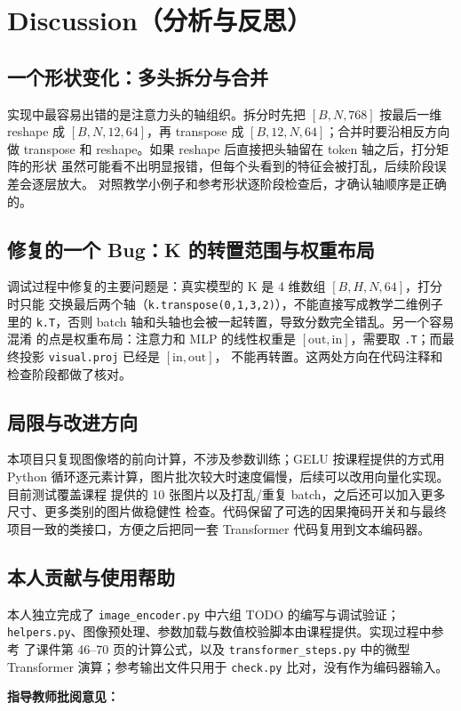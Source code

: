 \documentclass[a4paper,12pt]{article}
\begin{document}
\section{Discussion（分析与反思）}
\subsection{一个形状变化：多头拆分与合并}
实现中最容易出错的是注意力头的轴组织。拆分时先把 $[B,N,768]$ 按最后一维 reshape
成 $[B,N,12,64]$，再 transpose 成 $[B,12,N,64]$；合并时要沿相反方向做
transpose 和 reshape。如果 reshape 后直接把头轴留在 token 轴之后，打分矩阵的形状
虽然可能看不出明显报错，但每个头看到的特征会被打乱，后续阶段误差会逐层放大。
对照教学小例子和参考形状逐阶段检查后，才确认轴顺序是正确的。
\subsection{修复的一个 Bug：K 的转置范围与权重布局}
调试过程中修复的主要问题是：真实模型的 K 是 4 维数组 $[B,H,N,64]$，打分时只能
交换最后两个轴（\texttt{k.transpose(0,1,3,2)}），不能直接写成教学二维例子里的
\texttt{k.T}，否则 batch 轴和头轴也会被一起转置，导致分数完全错乱。另一个容易混淆
的点是权重布局：注意力和 MLP 的线性权重是 $[\text{out},\text{in}]$，需要取
\texttt{.T}；而最终投影 \texttt{visual.proj} 已经是 $[\text{in},\text{out}]$，
不能再转置。这两处方向在代码注释和检查阶段都做了核对。
\subsection{局限与改进方向}
本项目只复现图像塔的前向计算，不涉及参数训练；GELU 按课程提供的方式用 Python
循环逐元素计算，图片批次较大时速度偏慢，后续可以改用向量化实现。目前测试覆盖课程
提供的 10 张图片以及打乱/重复 batch，之后还可以加入更多尺寸、更多类别的图片做稳健性
检查。代码保留了可选的因果掩码开关和与最终项目一致的类接口，方便之后把同一套
Transformer 代码复用到文本编码器。
\subsection{本人贡献与使用帮助}
本人独立完成了 \texttt{image\_encoder.py} 中六组 TODO 的编写与调试验证；
\texttt{helpers.py}、图像预处理、参数加载与数值校验脚本由课程提供。实现过程中参考
了课件第 46--70 页的计算公式，以及 \texttt{transformer\_steps.py} 中的微型
Transformer 演算；参考输出文件只用于 \texttt{check.py} 比对，没有作为编码器输入。
\newpage
\vspace{1cm}

\noindent \textbf{指导教师批阅意见：}
\vspace{5.5cm}
\end{document}
